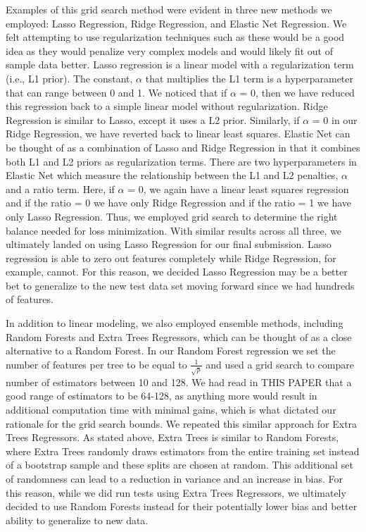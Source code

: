 \documentclass[11pt, oneside]{article}   	%
\begin{document}
Examples of this grid search method were evident in three new methods we employed: Lasso Regression, Ridge Regression, and Elastic Net Regression. We felt attempting to use regularization techniques such as these would be a good idea as they would penalize very complex models and would likely fit out of sample data better. Lasso regression is a linear model with a regularization term (i.e., L1 prior). The constant, $\alpha$ that multiplies the L1 term is a hyperparameter that can range between 0 and 1. We noticed that if $\alpha$ = 0, then we have reduced this regression back to a simple linear model without regularization. Ridge Regression is similar to Lasso, except it uses a L2 prior. Similarly, if $\alpha$ = 0 in our Ridge Regression, we have reverted back to linear least squares. Elastic Net can be thought of as a combination of Lasso and Ridge Regression in that it combines both L1 and L2 priors as regularization terms. There are two hyperparameters in Elastic Net which measure the relationship between the L1 and L2 penalties, $\alpha$ and a ratio term. Here, if $\alpha$ = 0, we again have a linear least squares regression and if the ratio = 0 we have only Ridge Regression and if the ratio = 1 we have only Lasso Regression. Thus, we employed grid search to determine the right balance needed for loss minimization. With similar results across all three, we ultimately landed on using Lasso Regression for our final submission. Lasso regression is able to zero out features completely while Ridge Regression, for example, cannot. For this reason, we decided Lasso Regression may be a better bet to generalize to the new test data set moving forward since we had hundreds of features. 

In addition to linear modeling, we also employed ensemble methods, including Random Forests and Extra Trees Regressors, which can be thought of as a close alternative to a Random Forest. In our Random Forest regression we set the number of features per tree to be equal to $\frac{1}{\sqrt{p}}$ and used a grid search to compare number of estimators between 10 and 128. We had read in THIS PAPER that a good range of estimators to be 64-128, as anything more would result in additional computation time with minimal gains, which is what dictated our rationale for the grid search bounds. We repeated this similar approach for Extra Trees Regressors. As stated above, Extra Trees is similar to Random Forests, where Extra Trees randomly draws estimators from the entire training set instead of a bootstrap sample and these splits are chosen at random. This additional set of randomness can lead to a reduction in variance and an increase in bias. For this reason, while we did run tests using Extra Trees Regressors, we ultimately decided to use Random Forests instead for their potentially lower bias and better ability to generalize to new data. 
\end{document}
